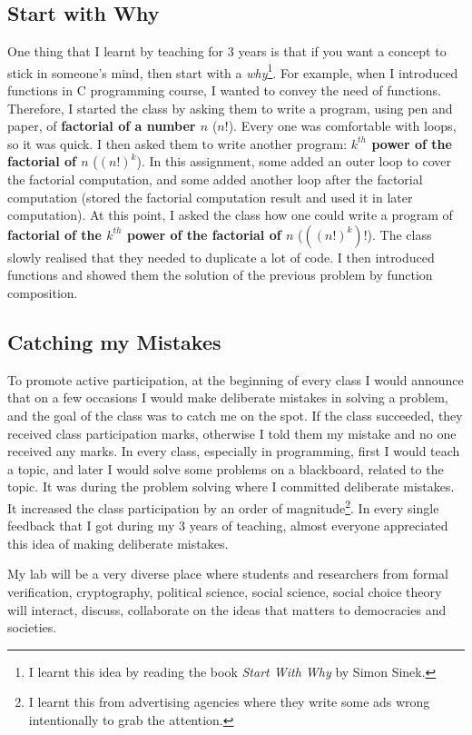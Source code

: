 \documentclass[a4paper]{article}
\begin{document}
\subsection{Start with Why}
One thing that I learnt by teaching for 3 years is that if you want a concept 
to stick in someone's mind, then start with a \textit{why}\footnote{I learnt this idea by reading the book 
\textit{Start With Why} by Simon Sinek.}. For example, when I introduced functions 
in C programming course, I wanted to convey the need of functions. Therefore, I started the class by 
asking them to write a program, using pen and paper, of \textbf{factorial of a number $n$} ($n!$). 
Every one was comfortable with loops, so it was quick. I then asked them to write 
another program: \textbf{$k^{th}$ power of the factorial of $n$} ($(n!)^k$). 
In this assignment, some added an outer loop to cover the factorial computation, 
and some added another loop after the factorial computation (stored the factorial 
computation result and used it in later computation). 
At this point, I asked the class 
how one could write a program of \textbf{factorial of 
the $k^{th}$ power of the factorial of $n$} ($((n!)^k)!$). The class slowly realised 
that they needed to duplicate a lot of code. I then introduced functions 
and showed them the solution of the previous problem by function composition.


\subsection{Catching my Mistakes}
To promote active participation, at the beginning of every class I would announce that 
on a few occasions I would make deliberate mistakes in solving a problem, and the
goal of the class was to catch me on the spot.
If the class succeeded, they received  
class participation marks, otherwise I told them my 
mistake and no one received any marks.
In every class, especially in programming, 
first I would teach a topic, and later I would solve some problems on 
a blackboard, related to the topic. 
It was during the problem solving where I committed deliberate mistakes.
It increased the class participation by an order of 
magnitude\footnote{I learnt this 
from advertising agencies where they write some ads wrong 
intentionally to grab the attention.}. In every single 
feedback that I got during my 3 years of teaching, 
almost everyone appreciated this idea of making deliberate mistakes. 





My lab will be a very diverse place where students and researchers from formal 
verification, cryptography, 
political science, social science, social choice theory will interact, discuss, 
collaborate on the ideas that matters to democracies and societies. 
\end{document}
